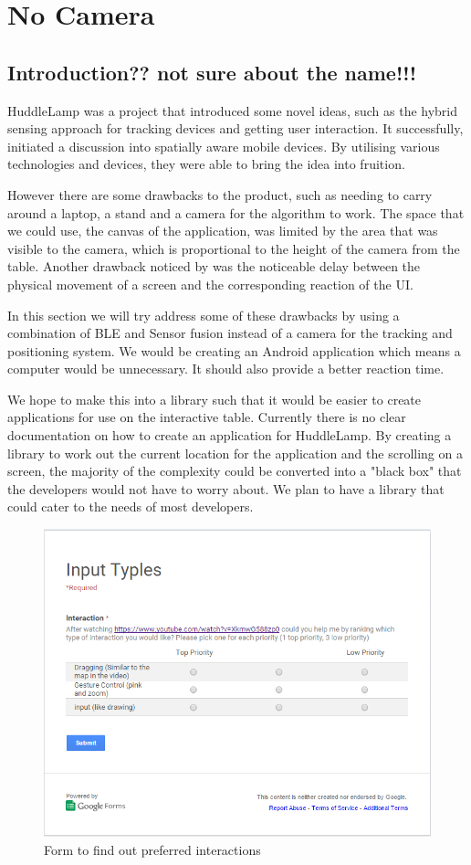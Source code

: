 \chapter{No Camera}

\label{ch:no_camera}

\section{Introduction?? not sure about the name!!!}
HuddleLamp was a project that introduced some novel ideas, such as the hybrid sensing approach for tracking devices and getting user interaction. It successfully, initiated a discussion into spatially aware mobile devices. By utilising various technologies and devices, they were able to bring the idea into fruition. 

However there are some drawbacks to the product, such as needing to carry around a laptop, a stand and a camera for the algorithm to work. The space that we could use, the canvas of the application, was limited by the area that was visible to the camera, which is proportional to the height of the camera from the table. Another drawback noticed by \citeauthor{huddlelamp-paper} was the noticeable delay between the physical movement of a screen and the corresponding reaction of the UI\cite{huddlelamp-paper}. 

In this section we will try address some of these drawbacks by using a combination of BLE and Sensor fusion instead of a camera for the tracking and positioning system. We would be creating an Android application which means a computer would be unnecessary. It should also provide a better reaction time. 

We hope to make this into a library such that it would be easier to create applications for use on the interactive table. Currently there is no clear documentation on how to create an application for HuddleLamp. By creating a library to work out the current location for the application and the scrolling on a screen, the majority of the complexity could be converted into a "black box" that the developers would not have to worry about. We plan to have a library that could cater to the needs of most developers. 

\begin{figure}[h]
  \includegraphics[scale=0.7]{images/googleform}
  \protect\caption{Form to find out preferred interactions} 
  \label{googleform}
\end{figure}